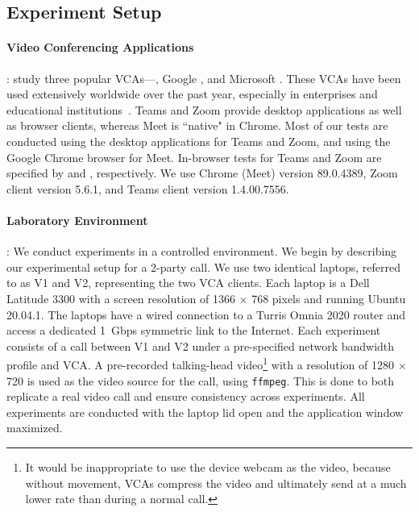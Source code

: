 \subsection{Experiment Setup} 
\label{subsec:setup}

\paragraph{Video Conferencing Applications}:
 study three popular VCAs---\zoom, Google \meet, and Microsoft \teams.
These VCAs have been used extensively worldwide over the past year, especially
in enterprises and educational institutions~\cite{vca_share}.  Teams and Zoom
provide desktop applications as well as browser clients, whereas Meet is ``native"
in  Chrome. Most of our tests are conducted using the desktop
applications for Teams and Zoom, and using the Google Chrome browser for Meet.
In-browser tests for Teams and Zoom are specified by \textit{\teamsbrowser}
and \textit{\zoombrowser}, respectively. We use Chrome (Meet) version
89.0.4389, Zoom client version 5.6.1, and Teams client version 1.4.00.7556. 

\paragraph{Laboratory Environment}:
We conduct experiments in a controlled environment.  We begin by describing our experimental setup for a 2-party call. We use two identical laptops, referred to as V1 and V2, representing the two VCA clients. Each laptop is a Dell Latitude 3300 with a screen resolution of 1366 $\times$
768 pixels and running Ubuntu 20.04.1. The laptops have a wired connection to
a Turris Omnia 2020 router and access a dedicated 1~Gbps symmetric link
to the Internet.  Each experiment consists of a call between V1 and V2 under a
pre-specified network bandwidth profile and VCA. 
A pre-recorded talking-head video\footnote{It would be inappropriate to use the 
device webcam as the video, because without movement, VCAs compress the video and ultimately send at a much lower rate than during a normal call.} with a resolution of 1280 $\times$ 720 is used as the video source for the call, using \texttt{ffmpeg}.
This is done to both replicate a real video call and ensure consistency across
experiments. All experiments are conducted with the laptop lid open and the application window maximized. 

